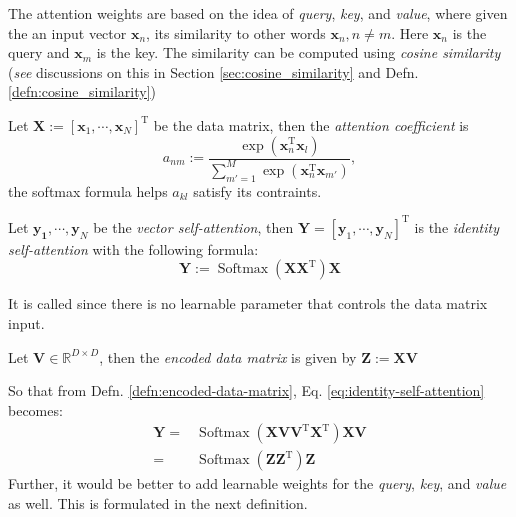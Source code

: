 The attention weights are based on the idea of \textit{query}, \textit{key}, and \textit{value}, where given the an input vector $\mathbf{x}_n$, its similarity to other words $\mathbf{x}_n,n\neq m$. Here $\mathbf{x}_n$ is the query and $\mathbf{x}_m$ is the key. The similarity can be computed using \textit{cosine similarity} (\textit{see} discussions on this in Section \ref{sec:cosine_similarity} and Defn. \ref{defn:cosine_similarity})
\begin{defn}
    Let $\mathbf{X}:=[\mathbf{x}_1,\cdots,\mathbf{x}_N]^{\text{T}}$ be the data matrix, then the \textit{attention coefficient} is
    \begin{equation}
        a_{nm}:=\frac{\exp(\mathbf{x}_n^{\text{T}}\mathbf{x}_l)}{\displaystyle\sum_{m'=1}^{M}\exp(\mathbf{x}_n^{\text{T}}\mathbf{x}_{m'})},
    \end{equation}
    the softmax formula helps $a_{kl}$ satisfy its contraints.
\end{defn}
\begin{defn}
    Let $\mathbf{y_1},\cdots,\mathbf{y}_N$ be the \textit{vector self-attention}, then $\mathbf{Y}=[\mathbf{y}_1,\cdots,\mathbf{y}_N]^{\text{T}}$ is the \textit{identity self-attention} with the following formula:
    \begin{equation}\label{eq:identity-self-attention}
        \mathbf{Y}:=\operatorname{Softmax}(\mathbf{X}\mathbf{X}^{\text{T}})\mathbf{X}
    \end{equation}
\end{defn}
\begin{remark}
    It is called  since there is no learnable parameter that controls the data matrix input.
\end{remark}
\begin{defn}\label{defn:encoded-data-matrix}
    Let $\mathbf{V}\in\mathbb{R}^{D\times D}$, then the \textit{encoded data matrix} is given by $\mathbf{Z}:=\mathbf{X}\mathbf{V}$
\end{defn}
So that from Defn. \ref{defn:encoded-data-matrix}, Eq. \ref{eq:identity-self-attention} becomes:
\begin{align}
    \mathbf{Y}=&\operatorname{Softmax}(\mathbf{X}\mathbf{V}\mathbf{V}^{\text{T}}\mathbf{X}^{\text{T}})\mathbf{X}\mathbf{V}\\
    =&\operatorname{Softmax}(\mathbf{Z}\mathbf{Z}^{\text{T}})\mathbf{Z}
\end{align}
Further, it would be better to add learnable weights for the \textit{query}, \textit{key}, and \textit{value} as well. This is formulated in the next definition.
